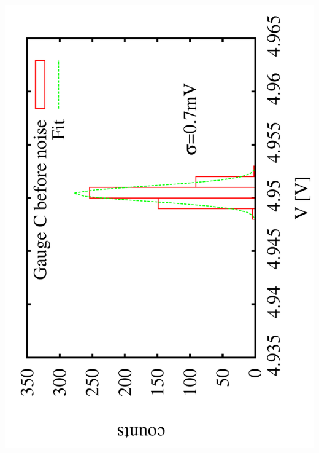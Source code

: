 \documentclass[a4paper,11pt]{book}
\begin{document}
\includegraphics[scale=0.15,angle=-90]{image_ai_21e5.pdf}
\end{document}
